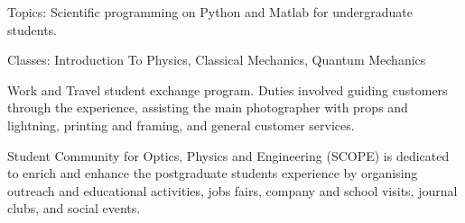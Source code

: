 \documentclass[10pt,a4paper,ragged2e,withhyper]{altacv}
\begin{document}

Topics: Scientific programming on Python and Matlab for undergraduate students.

\divider


Classes: Introduction To Physics, Classical Mechanics, Quantum Mechanics

\divider


Work and Travel student exchange program.
Duties involved guiding customers through the experience, assisting the main photographer with
props and lightning, printing and framing, and general customer services.



Student Community for Optics, Physics and Engineering (SCOPE) is dedicated
to enrich and enhance the postgraduate students experience by organising outreach and
educational activities, jobs fairs, company and school visits, journal clubs,
and social events.




\end{document}
